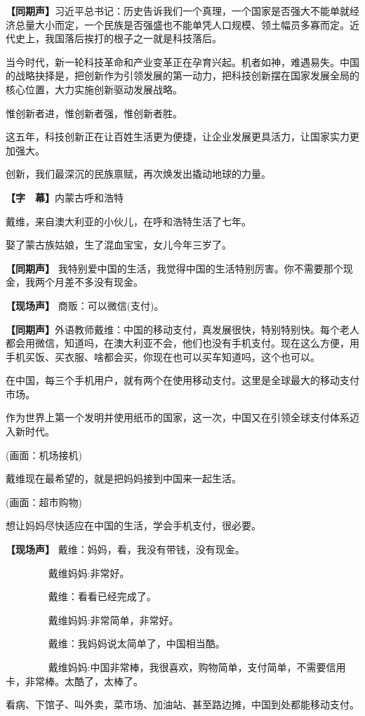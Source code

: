 \documentclass{ctexart}
\newcommand{\zkh}[1]{\textbf{\hspace{-2.7em} 【#1】}}
\begin{document}
 \zkh{同期声}习近平总书记：历史告诉我们一个真理，一个国家是否强大不能单就经济总量大小而定，一个民族是否强盛也不能单凭人口规模、领土幅员多寡而定。近代史上，我国落后挨打的根子之一就是科技落后。

 
当今时代，新一轮科技革命和产业变革正在孕育兴起。机者如神，难遇易失。中国的战略抉择是，把创新作为引领发展的第一动力，把科技创新摆在国家发展全局的核心位置，大力实施创新驱动发展战略。

 惟创新者进，惟创新者强，惟创新者胜。

这五年，科技创新正在让百姓生活更为便捷，让企业发展更具活力，让国家实力更加强大。

 创新，我们最深沉的民族禀赋，再次焕发出撬动地球的力量。

\zkh{字　幕}内蒙古呼和浩特

 戴维，来自澳大利亚的小伙儿，在呼和浩特生活了七年。

 娶了蒙古族姑娘，生了混血宝宝，女儿今年三岁了。

 \zkh{同期声} 
我特别爱中国的生活，我觉得中国的生活特别厉害。你不需要那个现金，我两个月差不多没有现金。

 \zkh{现场声} 商贩：可以微信(支付)。

 \zkh{同期声}外语教师戴维：中国的移动支付，真发展很快，特别特别快。每个老人都会用微信，知道吗，在澳大利亚不会，他们也没有手机支付。现在这么方便，用手机买饭、买衣服、啥都会买，你现在也可以买车知道吗，这个也可以。

 
在中国，每三个手机用户，就有两个在使用移动支付。这里是全球最大的移动支付市场。

作为世界上第一个发明并使用纸币的国家，这一次，中国又在引领全球支付体系迈入新时代。

 (画面：机场接机)

 戴维现在最希望的，就是把妈妈接到中国来一起生活。

 (画面：超市购物)

 想让妈妈尽快适应在中国的生活，学会手机支付，很必要。

 \zkh{现场声} 戴维：妈妈，看，我没有带钱，没有现金。

 　　　　 戴维妈妈:非常好。

 　　　　 戴维：看看已经完成了。

 　　　　 戴维妈妈:非常简单，非常好。

 　　　　 戴维：我妈妈说太简单了，中国相当酷。

 　　　　 戴维妈妈:中国非常棒，我很喜欢，购物简单，支付简单，不需要信用卡，非常棒。太酷了，太棒了。

 
看病、下馆子、叫外卖，菜市场、加油站、甚至路边摊，中国到处都能移动支付。
\end{document}
